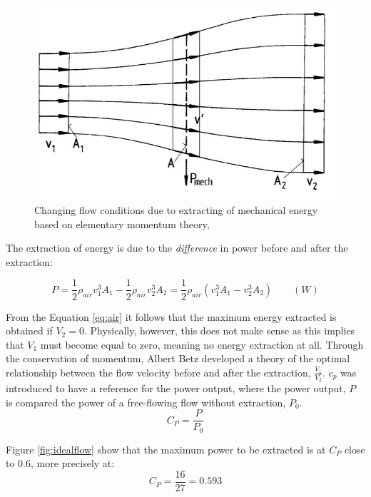 \begin{figure}[H]
\centering
\includegraphics[scale=0.6]{figures/flow}
\caption[$\; \:$Changing flow conditions due to extracting of mechanical]{Changing flow conditions due to extracting of mechanical energy based on elementary momentum theory, \cite{Hau2013} }
 \label{fig:flow}
\end{figure}

\noindent The extraction of energy is due to the \textit{difference} in power before and after the extraction: 

\begin{equation}
    P = \frac{1}{2}\rho_{air} v^3_1 A_1 - \frac{1}{2}\rho_{air} v^3_2 A_2 =\frac{1}{2}\rho_{air}( v^3_1 A_1 - v^3_2 A_2) \qquad (W)
    \label{eq:air}
\end{equation}

\noindent From the Equation \ref{eq:air} it follows that the maximum energy extracted is obtained if $V_2=0$. Physically, however, this does not make sense as this implies that $V_1$ must become equal to zero, meaning no energy extraction at all. Through the conservation of momentum, Albert Betz developed a theory of the optimal relationship between the flow velocity before and after the extraction, $\frac{V_1}{V_2}$. $c_p$ was introduced to have a reference for the power output, where the power output, $P$  is compared the power of a free-flowing flow without extraction, $P_0$. 
  \begin{equation}
    C_P = \frac{P}{P_0}
\end{equation}

Figure \ref{fig:idealflow} show that the maximum power to be extracted is at $C_P$ close to 0.6, more precisely at: 
 \begin{equation}
    C_P = \frac{16}{27} = 0.593
\end{equation}

